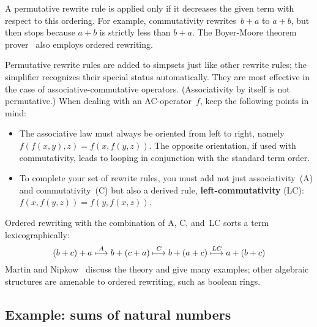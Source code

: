 \medskip

A permutative rewrite rule is applied only if it decreases the given
term with respect to this ordering.  For example, commutativity
rewrites~$b+a$ to $a+b$, but then stops because $a+b$ is strictly less
than $b+a$.  The Boyer-Moore theorem prover~\cite{bm88book} also
employs ordered rewriting.

Permutative rewrite rules are added to simpsets just like other
rewrite rules; the simplifier recognizes their special status
automatically.  They are most effective in the case of
associative-commutative operators.  (Associativity by itself is not
permutative.)  When dealing with an AC-operator~$f$, keep the
following points in mind:
\begin{itemize}
  
\item The associative law must always be oriented from left to right,
  namely $f(f(x,y),z) = f(x,f(y,z))$.  The opposite orientation, if
  used with commutativity, leads to looping in conjunction with the
  standard term order.

\item To complete your set of rewrite rules, you must add not just
  associativity~(A) and commutativity~(C) but also a derived rule, {\bf
    left-com\-mut\-ativ\-ity} (LC): $f(x,f(y,z)) = f(y,f(x,z))$.
\end{itemize}
Ordered rewriting with the combination of A, C, and~LC sorts a term
lexicographically:
\[\def\maps#1{\stackrel{#1}{\longmapsto}}
 (b+c)+a \maps{A} b+(c+a) \maps{C} b+(a+c) \maps{LC} a+(b+c) \]
Martin and Nipkow~\cite{martin-nipkow} discuss the theory and give many
examples; other algebraic structures are amenable to ordered rewriting,
such as boolean rings.

\subsection{Example: sums of natural numbers}

